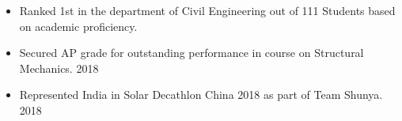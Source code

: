 
\begin{itemize}
    \setlength\itemsep{0.7mm}
    \item Ranked 1st in the department of Civil Engineering out of 111 Students based on academic proficiency.
    \item Secured AP grade for outstanding performance in course on Structural Mechanics. \hfill {2018}
    \item Represented India in Solar Decathlon China 2018 as part of Team Shunya.  \hfill{2018}
\end{itemize}{}

